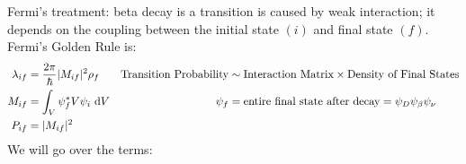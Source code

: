 \documentclass{school-22.101-notes}
\date{November 23, 2011}
\begin{document}
\maketitle

Fermi's treatment: beta decay is a transition is caused by weak interaction; it depends on the coupling between the initial state $(i)$ and final state $(f)$. Fermi's Golden Rule is:
\begin{align}
\lambda_{if} &= \frac{2\pi}{\hbar} |M_{if}|^2 \rho_f  & \mbox{Transition Probability} &\sim \mbox{Interaction Matrix} \times \mbox{Density of Final States} \\
M_{if} &= \int_{V} \psi_f^* V \psi_i \mbox{ }\mathrm{d} V   &  \psi_f &= \mbox{entire final state after decay} = \psi_D \psi_{\beta} \psi_{\nu} \\
P_{if} &= |M_{if}|^2
\end{align}
We will go over the terms:
\end{document}
